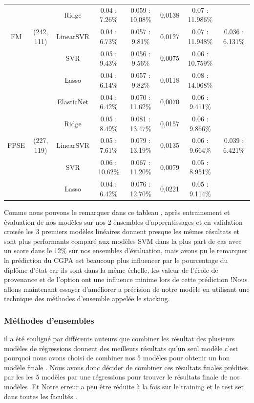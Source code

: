 \begin{table}
{{\begin{tabular}{|c|c|c|c|c|c|c|c|}
		&              &       Ridge &   0.04 : 7.26\% &  0.059  : 10.08\% &       0,0138 &  0.07 : 11.986\% &                 \\ \cline{3-8}
		FM &   (242, 111) &   LinearSVR &   0.04 : 6.73\% &   0.057  : 9.81\% &       0,0127 &  0.07 : 11.948\% &  0.036 : 6.131\% \\ \cline{3-8}
		&              &         SVR &   0.05 : 9.43\% &   0.056  : 9.56\% &       0,0075 &  0.06 : 10.759\% &                 \\ \cline{3-8}
		&              &       Lasso &   0.04 : 6.14\% &   0.057  : 9.82\% &       0,0118 &  0.08 : 14.068\% &                 \\ \cline{1-8}
		&              &  ElasticNet &   0.04 : 6.42\% &  0.070  : 11.62\% &       0,0070 &   0.06 : 9.411\% &                 \\ \cline{3-8}
		&              &       Ridge &   0.05 : 8.49\% &  0.081  : 13.47\% &       0,0157 &   0.06 : 9.866\% &                 \\ \cline{3-8}
		FPSE &   (227, 119) &   LinearSVR &   0.05 : 7.61\% &  0.079  : 13.19\% &       0,0135 &   0.06 : 9.664\% &  0.039 : 6.421\% \\ \cline{3-8}
		&              &         SVR &  0.06 : 10.62\% &  0.067  : 11.20\% &       0,0079 &   0.05 : 8.951\% &                 \\ \cline{3-8}
		&              &       Lasso &   0.04 : 6.42\% &  0.076  : 12.70\% &       0,0221 &   0.05 : 9.114\% &                 \\ \cline{1-8}
	\end{tabular}}}
	\endgroup
\end{table}
\newpage
Comme nous pouvons le remarquer dans ce tableau , après entrainement et évaluation de nos modèles sur nos 2 ensembles d'apprentissages et en validation croisée les 3 premiers modèles linéaires donnent presque les mêmes résultats et sont plus performants comparé aux modèles \ac{SVM} dans la plus part de cas avec un score dans le 12\% sur nos ensembles d'évaluation, mais avons pu le remarquer la prédiction du \ac{CGPA} est beaucoup plus influencer par le pourcentage du diplôme d'état car ils sont dans la même échelle, les valeur de l'école de provenance et de l'option ont une influence minime lors de cette prédiction !Nous allons maintenant essayer d'améliorer a précision de notre modèle en utilisant  une technique des méthodes d'ensemble appelée le stacking.
\subsubsection{Méthodes d'ensembles}
il a été souligné par différents auteurs \cite{bookSckit-Learn} que combiner les résultat des plusieurs modèles de régressions donnent des meilleurs résultats qu'un seul modèle c'est pourquoi nous avons choisi de combiner nos 5 modèles pour obtenir un bon modèle finale .
Nous avons donc décider de combiner ces résultats finales prédites par les  les 5 modèles par une régressions pour trouver le résultats finale de nos modèles .Et Notre erreur a peu être réduite à la fois sur le training et le test set dans toutes les facultés .
\newpage
